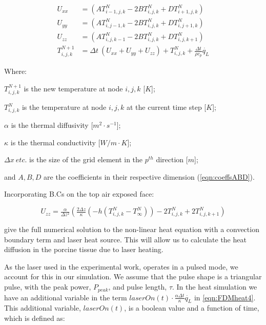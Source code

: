 \begin{align}
U_{xx} &=  (A T^N_{i-1,j,k} - 2B T^N_{i,j,k} + D T^N_{i+1,j,k}) \label{eqn:FDMheat1}\\
U_{yy} &=  (A T^N_{i,j-1,k} - 2B T^N_{i,j,k} + D T^N_{i,j+1,k}) \label{eqn:FDMheat2}\\
U_{zz} &=  (A T^N_{i,j,k-1} - 2B T^N_{i,j,k} + D T^N_{i,j,k+1}) \label{eqn:FDMheat3}\\
T^{N+1}_{i,j,k} &= \Delta t\ (U_{xx} + U_{yy} + U_{zz}) + T^{N}_{i,j,k} + \tfrac{\Delta t}{\rho c_p}\dot{q_L} \label{eqn:FDMheat4}
\end{align}

\noindent Where:

	\indent $T^{N+1}_{i,j,k}$ is the new temperature at node $i,j,k$ [$K$];
	
	\indent $T^N_{i,j,k}$ is the temperature at node $i,j,k$ at the current time step [$K$];
	
	\indent $\alpha$ is the thermal diffusivity [$m^2\cdot s^{-1}$];
	
	\indent $\kappa$ is the thermal conductivity [$W/m\cdot K$];
	
	\indent $\Delta x\ etc.$ is the size of the grid element in the $p^{th}$ direction [$m$];
	
	\indent and $A, B,D$ are the coefficients in their respective dimension (\cref{eqn:coeffsABD}).

	\medskip
	
Incorporating B.Cs on the top air exposed face:

\begin{equation}
U_{zz} = \tfrac{\alpha}{\Delta z^2} (\tfrac{2 \Delta z}{\kappa} (-h(T^N_{i,j,k}-T^N_\infty) ) -2 T^N_{i,j,k} + 2T^N_{i,j,k+1})\label{eqn:bceqn} 
\end{equation}

 give the full numerical solution to the non-linear heat equation with a convection boundary term and laser heat source. This will allow us to calculate the heat diffusion in the porcine tissue due to laser heating.

\medskip

As the laser used in the experimental work, operates in a pulsed mode, we account for this in our simulation. We assume that the pulse shape is a triangular pulse, with the peak power, $P_{peak}$, and pulse length, $\tau$. In the heat simulation we have an additional variable in the term $laserOn(t)\cdot\tfrac{\alpha \Delta t}{\kappa}\dot{q_L}$ in \cref{eqn:FDMheat4}. This additional variable, $laserOn(t)$, is a boolean value and a function of time, which is defined as:

